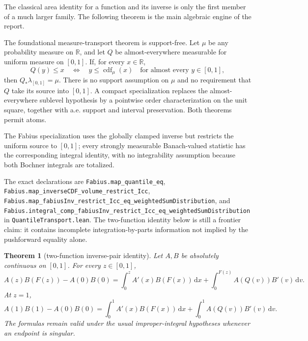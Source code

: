 \documentclass[11pt,oneside]{article}
\newtheorem{theorem}{Theorem}[section]
\theoremstyle{definition}
\newcommand{\F}{F}
\newcommand{\Q}{Q}
\newcommand{\R}{\mathbb R}
\newcommand{\dd}{\,\mathrm d}
\begin{document}
The classical area identity for a function and its inverse is only the first member of
a much larger family.  The following theorem is the main algebraic engine of the report.

\begin{statusbox}
The foundational measure-transport theorem is support-free.  Let \(\mu\) be any
probability measure on \(\R\), and let \(Q\) be almost-everywhere measurable for uniform
measure on \([0,1]\).  If, for every \(x\in\R\),
\[
 Q(y)\le x\quad\Longleftrightarrow\quad y\le\operatorname{cdf}_{\mu}(x)
 \quad\text{for almost every \(y\in[0,1]\)},
\]
then \(Q_*\lambda_{[0,1]}=\mu\).  There is no support assumption on \(\mu\) and no
requirement that \(Q\) take its source into \([0,1]\).  A compact specialization replaces
the almost-everywhere sublevel hypothesis by a pointwise order characterization on the
unit square, together with a.e. support and interval preservation.  Both theorems permit
atoms.

The Fabius specialization uses the globally clamped inverse but restricts the uniform
source to \([0,1]\); every strongly measurable Banach-valued statistic has the
corresponding integral identity,
with no integrability assumption because both Bochner integrals are totalized.

The exact declarations are
\nolinkurl{Fabius.map_quantile_eq},
\nolinkurl{Fabius.map_inverseCDF_volume_restrict_Icc},
\nolinkurl{Fabius.map_fabiusInv_restrict_Icc_eq_weightedSumDistribution}, and
\nolinkurl{Fabius.integral_comp_fabiusInv_restrict_Icc_eq_weightedSumDistribution}
in \texttt{QuantileTransport.lean}.  The two-function identity below is still a
frontier claim: it contains incomplete integration-by-parts information not implied by
the pushforward equality alone.
\end{statusbox}

\begin{theorem}[two-function inverse-pair identity]\label{thm:AB}
Let \(A,B\) be absolutely continuous on \([0,1]\).  For every \(z\in[0,1]\),
\begin{equation}\label{eq:AB-incomplete}
 A(z)B(\F(z))-A(0)B(0)
 =\int_0^z A'(x)B(\F(x))\dd x
 +\int_0^{\F(z)}A(\Q(v))B'(v)\dd v.
\end{equation}
At \(z=1\),
\begin{equation}\label{eq:AB-complete}
 A(1)B(1)-A(0)B(0)
 =\int_0^1A'(x)B(\F(x))\dd x
 +\int_0^1A(\Q(v))B'(v)\dd v.
\end{equation}
The formulas remain valid under the usual improper-integral hypotheses whenever an
endpoint is singular.
\end{theorem}
\end{document}
